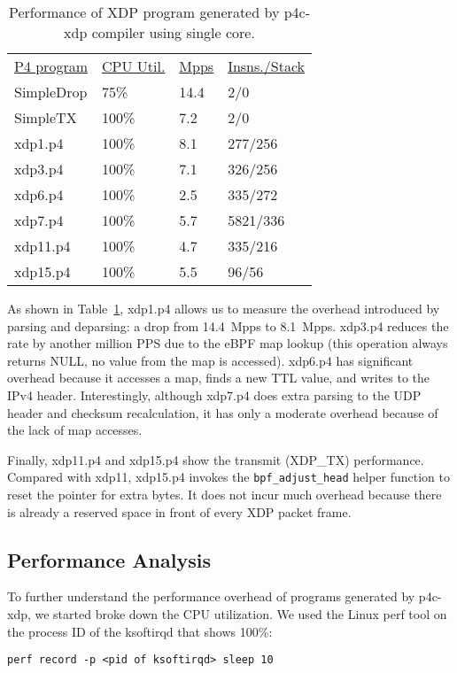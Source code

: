 \begin{table}
\centering
\small
\begin{tabular}{llll}
  \underline{P4 program} & \underline{CPU Util.} & \underline{Mpps} & \underline{Insns./Stack}\\
  SimpleDrop & 75\% & 14.4 & 2/0 \\
  SimpleTX & 100\% & 7.2 & 2/0 \\
  xdp1.p4 &  100\% &  8.1 & 277/256 \\
  xdp3.p4 &  100\% &  7.1 & 326/256 \\
  xdp6.p4 &  100\% &  2.5 & 335/272 \\
  xdp7.p4 &  100\% &  5.7 & 5821/336 \\
  xdp11.p4 &  100\% &  4.7  & 335/216 \\
  xdp15.p4 &  100\% &  5.5 & 96/56\\
\end{tabular}
\caption{\footnotesize Performance of XDP program generated by
  p4c-xdp compiler using single core.}
\label{tab:perf}
\end{table}

As shown in Table~\ref{tab:perf}, xdp1.p4 allows us to measure the
overhead introduced by parsing and deparsing: a drop from 14.4~Mpps to
8.1~Mpps.  xdp3.p4 reduces the rate by another million PPS due to the
eBPF map lookup (this operation always returns NULL, no value from the
map is accessed).  xdp6.p4 has significant overhead because it
accesses a map, finds a new TTL value, and writes to the IPv4 header.
Interestingly, although xdp7.p4 does extra parsing to the UDP header
and checksum recalculation, it has only a moderate overhead because of
the lack of map accesses.

Finally, xdp11.p4 and xdp15.p4 show the transmit (XDP\_TX)
performance.  Compared with xdp11, xdp15.p4 invokes the
\texttt{bpf\_adjust\_head} helper function to reset the pointer for extra
bytes.  It does not incur much overhead because there
is already a reserved space in front of every XDP packet frame.

\subsection{Performance Analysis}

To further understand the performance overhead of programs generated
by p4c-xdp, we started broke down the CPU utilization. We used the Linux
perf tool on the process ID of the ksoftirqd that shows 100\%:
\begin{lstlisting}[frame=none]
perf record -p <pid of ksoftirqd> sleep 10
\end{lstlisting}


